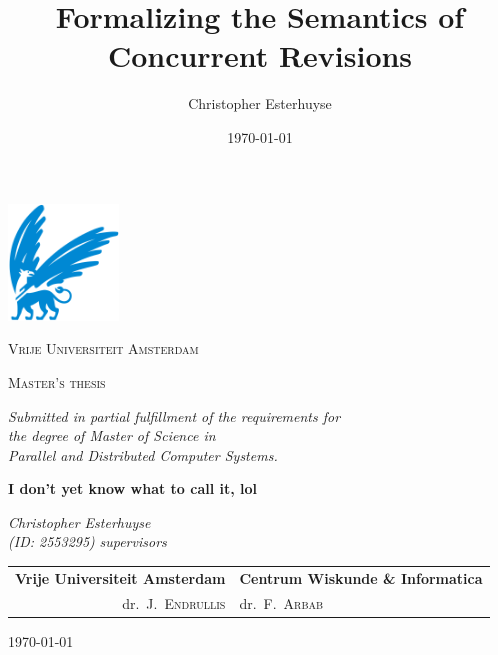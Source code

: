 \documentclass[11pt]{report}%
\title{Formalizing the Semantics of Concurrent Revisions}
\author{Christopher Esterhuyse}
\date{\today}
\theoremstyle{definition}
\theoremstyle{remark}
\begin{document}
\begin{titlepage}
	\centering
	\includegraphics[width=0.22\textwidth, trim={0 0.15cm 0 0}, clip]{img/vu.png}
	\par
	{\scshape\huge Vrije Universiteit Amsterdam \par}
	\vspace{1.5cm}
	{\scshape\LARGE Master's thesis\par \par
	\vspace{0.2cm}
	\small \textit{Submitted in partial fulfillment of the requirements for\\ the degree of Master of Science in\\ Parallel and Distributed Computer Systems.}\par}
	\vspace{1.5cm}
	{\Huge\bfseries \rm \textbf{I don't yet know what to call it, lol}\par}
	\vspace{1.5cm}
	{\Large\itshape\rm \noindent\textit{Christopher Esterhuyse}\\}
	\vspace{1mm}
	\textit{(ID: 2553295)}
	\vfill
		\rm \noindent \textit{supervisors} \\ \vspace{0.15cm}
	\begin{tabular}{r@{\hskip 0.4in}l}
\rm \textbf{Vrije Universiteit Amsterdam} & \textbf{Centrum Wiskunde \& Informatica} \\
dr.\ J.\ \textsc{Endrullis} & dr.\ F.\ \textsc{Arbab}
\end{tabular}

	\vfill


	{\large \today\par}
\end{titlepage}
\end{document}
